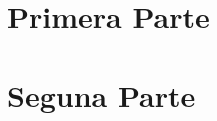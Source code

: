 \documentclass[12pt,oneside]{book}
\begin{document}
\pagestyle{empty}
\frontmatter
    
    
\mainmatter
    \part{Primera Parte}
    
      
    
   
    
   
    
    \part{Seguna Parte}
    
\backmatter
\end{document}
